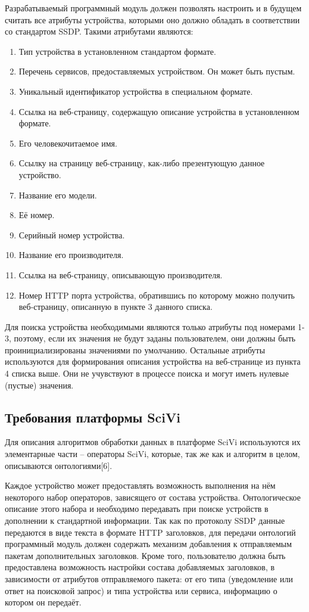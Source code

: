 Разрабатываемый программный модуль должен позволять настроить и в будущем считать все атрибуты устройства, которыми оно должно обладать в соответствии со стандартом SSDP.
Такими атрибутами являются:
\begin{enumerate}
	\item Тип устройства в установленном стандартом формате.
	\item Перечень сервисов, предоставляемых устройством.
	Он может быть пустым.
	\item Уникальный идентификатор устройства в специальном формате.
	\item Ссылка на веб-страницу, содержащую описание устройства в установленном формате.
	\item Его человекочитаемое имя.
	\item Ссылку на страницу веб-страницу, как-либо презентующую данное устройство.
	\item Название его модели.
	\item Её номер.
	\item Серийный номер устройства.
	\item Название его производителя.
	\item Ссылка на веб-страницу, описывающую производителя.
	\item Номер HTTP порта устройства, обратившись по которому можно получить веб-страницу, описанную в пункте 3 данного списка.
\end{enumerate}

Для поиска устройства необходимыми являются только атрибуты под номерами 1-3, поэтому, если их значения не будут заданы пользователем, они должны быть проинициализированы значениями по умолчанию.
Остальные атрибуты используются для формирования описания устройства на веб-странице из пункта 4 списка выше.
Они не учувствуют в процессе поиска и могут иметь нулевые (пустые) значения.

\subsection{Требования платформы SciVi}
Для описания алгоритмов обработки данных в платформе SciVi используются их элементарные части – операторы SciVi, которые, так же как и алгоритм в целом, описываются онтологиями[6].

Каждое устройство может предоставлять возможность выполнения на нём некоторого набор операторов, зависящего от состава устройства.
Онтологическое описание этого набора и необходимо передавать при поиске устройств в дополнении к стандартной информации.
Так как по протоколу SSDP данные передаются в виде текста в формате HTTP заголовков, для передачи онтологий программный модуль должен содержать механизм добавления к отправляемым пакетам дополнительных заголовков.
Кроме того, пользователю должна быть предоставлена возможность настройки состава добавляемых заголовков, в зависимости от атрибутов отправляемого пакета: от его типа (уведомление или ответ на поисковой запрос) и типа устройства или сервиса, информацию о котором он передаёт.

